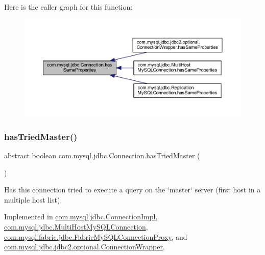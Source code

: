 Here is the caller graph for this function\+:\nopagebreak
\begin{figure}[H]
\begin{center}
\leavevmode
\includegraphics[width=350pt]{interfacecom_1_1mysql_1_1jdbc_1_1_connection_aa075b035aedfaf2d59114dde53cfc3de_icgraph}
\end{center}
\end{figure}
\mbox{\label{interfacecom_1_1mysql_1_1jdbc_1_1_connection_a2bc23d62512f6dfaac0566369a0125df}} 
\subsubsection{\texorpdfstring{has\+Tried\+Master()}{hasTriedMaster()}}
{\footnotesize\ttfamily abstract boolean com.\+mysql.\+jdbc.\+Connection.\+has\+Tried\+Master (\begin{DoxyParamCaption}{ }\end{DoxyParamCaption})\hspace{0.3cm}{\ttfamily [abstract]}}

Has this connection tried to execute a query on the \char`\"{}master\char`\"{} server (first host in a multiple host list). 

Implemented in \mbox{\hyperlink{classcom_1_1mysql_1_1jdbc_1_1_connection_impl_a0ec4ef24675c2376faaa45c842031f69}{com.\+mysql.\+jdbc.\+Connection\+Impl}}, \mbox{\hyperlink{classcom_1_1mysql_1_1jdbc_1_1_multi_host_my_s_q_l_connection_a0c6bc4351473d95ef46999773702ed18}{com.\+mysql.\+jdbc.\+Multi\+Host\+My\+S\+Q\+L\+Connection}}, \mbox{\hyperlink{classcom_1_1mysql_1_1fabric_1_1jdbc_1_1_fabric_my_s_q_l_connection_proxy_a5938814c6d244a604886cd23a540be7d}{com.\+mysql.\+fabric.\+jdbc.\+Fabric\+My\+S\+Q\+L\+Connection\+Proxy}}, and \mbox{\hyperlink{classcom_1_1mysql_1_1jdbc_1_1jdbc2_1_1optional_1_1_connection_wrapper_a81b35d775907ec47cd7d3b1007700939}{com.\+mysql.\+jdbc.\+jdbc2.\+optional.\+Connection\+Wrapper}}.

